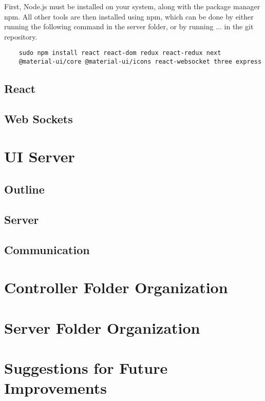 \documentclass{article}
\begin{document}
	First, Node.js must be installed on your system, along with the package manager npm. All other tools are then installed using npm, which can be done by either running the following command in the server folder, or by running ... in the git repository.
	
	\begin{verbatim}
	sudo npm install react react-dom redux react-redux next 
	@material-ui/core @material-ui/icons react-websocket three express
	\end{verbatim}
	
	\subsection{React}
	\subsection{Web Sockets}
	
\section{UI Server}
	\subsection{Outline}
	\subsection{Server}
	\subsection{Communication}

\section{Controller Folder Organization}
\section{Server Folder Organization}

\section{Suggestions for Future Improvements}
		
\end{document}
